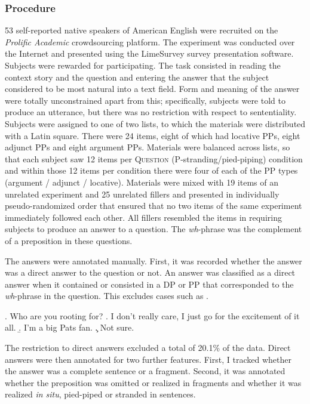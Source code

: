 \subsubsection{Procedure} 
53 self-reported native speakers of American English were recruited on the \textit{Prolific Academic} crowdsourcing platform. The experiment was conducted over the Internet and presented using the LimeSurvey survey presentation software. Subjects were rewarded  for participating. The task consisted in reading the context story and the question and entering the answer that the subject considered to be most natural into a text field. Form and meaning of the answer were totally unconstrained apart from this; specifically, subjects were told to produce an utterance, but there was no restriction with respect to sententiality. Subjects were assigned to one of two lists, to which the materials were distributed with a Latin square. There were 24 items, eight of which had locative PPs, eight adjunct PPs and eight argument PPs. Materials were balanced across lists, so that each subject saw 12 items per \textsc{Question} (P-stranding/pied-piping) condition and within those 12 items per condition there were four of each of the PP types (argument / adjunct / locative). Materials were mixed with 19 items of an unrelated experiment and 25 unrelated fillers and presented in individually pseudo-randomized order that ensured that no two items of the same experiment immediately followed each other. All fillers resembled the items in requiring subjects to produce an answer to a question. The \textit{wh}-phrase was the complement of a preposition in these questions.

The answers were annotated manually. First, it was recorded whether the answer was a direct answer to the question or not. An answer was classified as a direct answer when it contained or consisted in a DP or PP that corresponded to the \textit{wh}-phrase in the question. This excludes cases such as \Next.

\ex. Who are you rooting for?
\a. I don't really care, I just go for the excitement of it all. 
     \b. I'm a big Pats fan.
     \c. Not sure.
     
The restriction to direct answers excluded a total of 20.1\% of the data. Direct answers were then annotated for two further features. First, I tracked whether the answer was a complete sentence or a fragment. Second, it was annotated whether the preposition was omitted or realized in fragments and whether it was realized \textit{in situ}, pied-piped or stranded in sentences.

